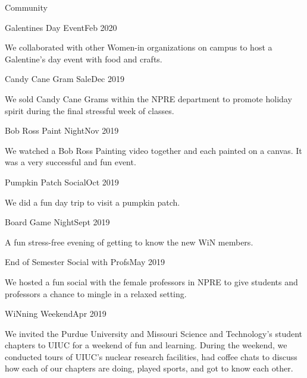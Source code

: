 \documentclass{resume2} %
\begin{document}
\begin{rSection}{Community}
	\begin{rSubsection}{Galentines Day Event}{Feb 2020}{}{}
		\item We collaborated with other Women-in organizations 
		on campus to host a Galentine's day event with food and crafts.
	\end{rSubsection}
	\begin{rSubsection}{Candy Cane Gram Sale}{Dec 2019}{}{}
		\item We sold Candy Cane Grams within the NPRE department to promote holiday spirit
		during the final stressful week of classes.
	\end{rSubsection}
	\begin{rSubsection}{Bob Ross Paint Night}{Nov 2019}{}{}
		\item We watched a Bob Ross Painting video together and each painted on a canvas. It was a very successful and fun event. 
	\end{rSubsection}
	\begin{rSubsection}{Pumpkin Patch Social}{Oct 2019}{}{}
		\item We did a fun day trip to visit a pumpkin patch.
	\end{rSubsection}
	\begin{rSubsection}{Board Game Night}{Sept 2019}{}{}
		\item A fun stress-free evening of getting to know the new WiN members.
	\end{rSubsection}
	\begin{rSubsection}{End of Semester Social with Profs}{May 2019}{}{}
		\item We hosted a fun social with the female professors in NPRE to
		give students and professors a chance to mingle in a relaxed setting.
	\end{rSubsection}
	\begin{rSubsection}{WiNning Weekend}{Apr 2019}{}{}
		\item We invited the Purdue University and Missouri Science and Technology's
		student chapters to UIUC for a weekend of fun and learning.
		During the weekend, we conducted tours of UIUC's nuclear research facilities,
		had coffee chats to discuss how each of our chapters are doing, played sports,
		and got to know each other.
	\end{rSubsection}
\end{rSection}
\end{document}
